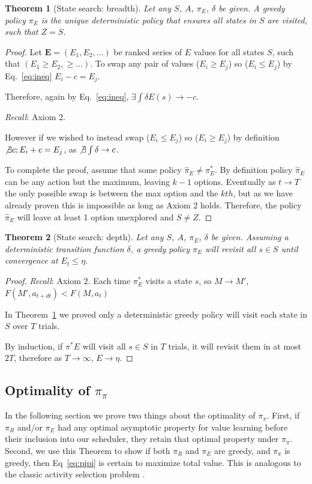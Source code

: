 \documentclass[9pt,lineno]{elife}
\newtheorem{theorem}{Theorem}
\begin{document}
\begin{theorem}[State search: breadth] \label{theorem:Z} 
    Let any $S$, $A$, $\pi_E$, $\delta$ be given. A greedy policy $\pi_E$ is the unique deterministic policy that ensures all states in $S$ are visited, such that $Z = S$. 
\end{theorem}
\begin{proof}
	Let $\mathbf{E} = (E_1, E_2, ...)$ be ranked series of $E$ values for all states $S$, such that $(E_1 \geq E_2, \geq ...)$. To swap any pair of values ($E_i \geq E_j$) so ($E_i \leq E_j$) by Eq.~\ref{eq:ineq} $E_i - c = E_j$. 
	
	Therefore, again by Eq.~\ref{eq:ineq}, $\exists \int \delta E(s) \rightarrow -c$. 
	
	\textit{Recall}: Axiom 2.
	
	However if we wished to instead swap ($E_i \leq E_j$) so ($E_i \geq E_j$) by definition $\not \exists c; E_i + c = E_j$, as $\not \exists \int \delta \rightarrow c$. 
	
	To complete the proof, assume that some policy $\hat \pi_E \neq \pi^*_E$. By definition policy $\hat \pi_E$ can be any action but the maximum, leaving $k-1$ options. Eventually as $t \rightarrow T$ the only possible swap is between the max option and the $kth$, but as we have already proven this is impossible as long as Axiom 2 holds. Therefore, the policy $\hat \pi_E$ will leave at least 1 option unexplored and $S \neq Z$. 
\end{proof}
\begin{theorem}[State search: depth] \label{theorem:convergence} 
	 Let any $S$, $A$, $\pi_E$, $\delta$ be given. Assuming a deterministic transition function $\delta$, a greedy policy $\pi_E$ will revisit all $s \in S$ until convergence at $E_t \leq \eta$. 
\end{theorem}
\begin{proof}
	\textit{Recall}: Axiom 2. Each time $\pi^*_E$ visits a state $s$, so $M \rightarrow M'$, $F(M', a_{t+dt}) < F(M, a_t)$
	
	In Theorem~\ref{theorem:Z} we proved only a deterministic greedy policy will visit each state in $S$ over $T$ trials.
	
	By induction, if $\pi^*E$ will visit all $s \in S$ in $T$ trials, it will revisit them in at most $2T$, therefore as $T \rightarrow \infty$, $E \rightarrow \eta$. 
\end{proof}

\subsection*{Optimality of $\pi_{\pi}$} \label{sec:opt_pipi} 
In the following section we prove two things about the optimality of $\pi_\pi$. First, if $\pi_R$ and/or $\pi_E$ had any optimal asymptotic property for value learning before their inclusion into our scheduler, they retain that optimal property under $\pi_\pi$. Second, we use this Theorem to show if both $\pi_R$ and $\pi_E$ are greedy, and $\pi_\pi$ is greedy, then Eq~\ref{eq:pipi} is certain to maximize total value. This is analogous to the classic activity selection problem \citep{Roughgarden2019}.
\end{document}
